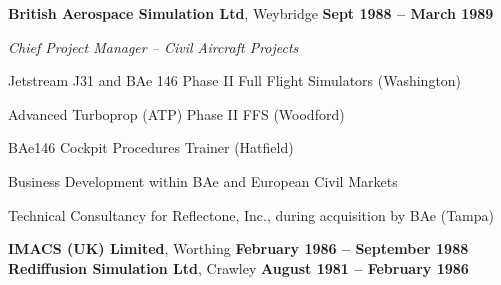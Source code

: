 \documentclass[10pt]{article}
\newenvironment{outerlist}[1][\enskip\textbullet]%
        {\begin{itemize}[#1]}{\end{itemize}%
         \vspace{-.6\baselineskip}}
\newenvironment{innerlist}[1][\enskip\textbullet]%
        {\begin{compactitem}[#1]}{\end{compactitem}}
\newcommand{\blankline}{\quad\pagebreak[2]}
\begin{document}
\blankline

\textbf{British Aerospace Simulation Ltd}, Weybridge        \hfill \textbf{Sept 1988 -- March 1989}

\begin{innerlist}

\item[] \textit{Chief Project Manager -- Civil Aircraft Projects}%
\begin{innerlist}
\item Jetstream J31 and BAe 146 Phase II Full Flight Simulators (Washington)
\item Advanced Turboprop (ATP) Phase II FFS (Woodford)
\item BAe146 Cockpit Procedures Trainer (Hatfield)
\item Business Development within BAe and European Civil Markets
\item Technical Consultancy for Reflectone, Inc., during acquisition by BAe (Tampa)

\end{innerlist}

\end{innerlist}

\blankline

%
%
%
%
%
%
%

\textbf{IMACS (UK) Limited}, Worthing        \hfill \textbf{February 1986 -- September 1988}\\
\textbf{Rediffusion Simulation Ltd}, Crawley        \hfill \textbf{August 1981 -- February 1986}
\end{document}
